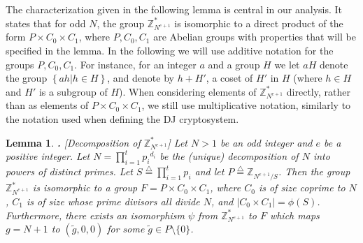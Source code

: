 \documentclass{article}
\def\eqdef{\stackrel {\triangle}{=}}
\newcommand{\order}{{\mathrm{ord}}}
\newcommand{\encdj}{{E}_{N,e}}
\newcommand{\set}[1]{\left\{#1\right\}}
\newcommand{\size}[1]{|#1|}
\newcommand{\condset}[2]{\set{#1|#2}}
\newcommand{\Z}{{\mathbb{Z}}}
\newtheorem{LEMMA}{Lemma}[section]
\newenvironment{lemma}{\begin{LEMMA} \hspace{-.85em} {\bf .} \rm}%
	{\end{LEMMA}}
\newcommand{\U}[1]{\mathbb{Z}_{#1}^*}
\begin{document}
The characterization given in the following lemma is central in our
analysis. It states that for odd $N$, the group $\U{N^{e+1}}$ is
isomorphic to a direct product of the form $P\times C_0\times C_1$,
where $P,C_0,C_1$ are Abelian groups with properties that will be
specified in the lemma. In the following we will use additive
notation for the groups $P,C_0,C_1$. For instance, for an integer $a$
and a group $H$ we let $aH$ denote the group $\condset{ah}{h\in H}$,
and denote by $h+H'$, a coset of $H'$ in $H$ (where $h\in H$ and $H'$
is a subgroup of $H$). When considering elements of $\U{N^{e+1}}$
directly, rather than as elements of $P\times C_0\times C_1$, we
still use multiplicative notation, similarly to the notation used
when defining the DJ cryptosystem.
\begin{lemma}[Decomposition of $\U{N^{e+1}}$]
\label{lem-g-structure} Let $N>1$ be an odd integer and $e$ be a
positive integer.  Let $N=\prod_{i=1}^t{p_i}^{d_i}$ be the (unique)
decomposition of $N$ into powers of distinct primes. Let
$S\eqdef\prod^t_{i=1}p_i$ and let $P\eqdef\Z_{N^{e+1}/S}$. Then the
group $\U{N^{e+1}}$ is isomorphic to a group $F= P\times C_0\times
C_1$, where $C_0$ is of size coprime to $N$, $C_1$ is of size whose
prime divisors all divide $N$, and $\size{C_0\times C_1}=\phi(S)$.
Furthermore, there exists an isomorphism $\psi$ from $\U{N^{e+1}}$ to $F$
which maps $g=N+1$ to $(\tilde{g},0,0)$ for some $\tilde{g}\in
P\setminus\{0\}$.
\end{lemma}

%
\end{document}
